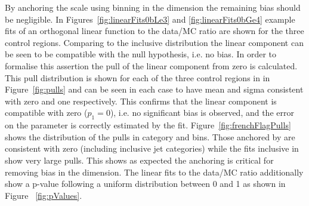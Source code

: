 By anchoring the scale using binning in the \scalht dimension the remaining
bias should be negligible. In Figures~\ref{fig:linearFits0bLe3} and \ref{fig:linearFits0bGe4} 
example fits of an orthogonal linear function to the data/MC ratio 
are shown for the three control regions. Comparing to the inclusive distribution 
the linear component can be seen to be compatible with the null hypothesis, 
i.e. no bias. In order to formalise this assertion 
the pull of the linear component from zero is calculated.
This pull distribution is shown for each of the three control regions in
in Figure~\ref{fig:pulls} and can be seen in each case to have mean and sigma
consistent with zero and one respectively. This confirms that the linear component 
is compatible with zero ($p_1 = 0$), i.e. no significant bias is observed, 
and the error on the parameter is correctly estimated by the fit.
Figure~\ref{fig:frenchFlagPulls} shows the distribution of the pulls 
in category and \scalht bins. Those anchored by \scalht are consistent
with zero (including inclusive jet categories) while the fits inclusive in \scalht
show very large pulls. This shows as expected the \scalht anchoring
is critical for removing bias in the \mht dimension. The linear fits to the
data/MC ratio additionally show a p-value following 
a uniform distribution between 0 and 1 as shown in Figure ~\ref{fig:pValues}.



